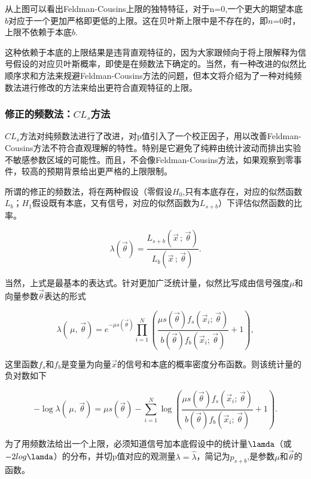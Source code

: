 从上图可以看出Feldman-Cousins上限的独特特征，对于n=0,一个更大的期望本底$b$对应于一个更加严格即更低的上限。这在贝叶斯上限中是不存在的，即$n$=0时，上限不依赖于本底$b$.

这种依赖于本底的上限结果是违背直观特征的，因为大家跟倾向于将上限解释为信号假设的对应贝叶斯概率，即使是在频数法下确定的。当然，有一种改进的似然比顺序求和方法来规避Feldman-Cousins方法的问题，但本文将介绍为了一种对纯频数法进行修改的方法来给出更符合直观特征的上限。

\subsubsection{修正的频数法：$CL_{s}$方法}

$CL_{s}$方法对纯频数法进行了改进，对p值引入了一个校正因子，用以改善Feldman-Cousins方法不符合直观理解的特性。特别是它避免了纯粹由统计波动而排出实验不敏感参数区域的可能性。而且，不会像Feldman-Cousins方法，如果观察到零事件，较高的预期背景给出更严格的上限限制。

所谓的修正的频数法，将在两种假设（零假设$H_{0}$,只有本底存在，对应的似然函数$L_{b}$；$H_{1}$假设既有本底，又有信号，对应的似然函数为$L_{s+b}$）下评估似然函数的比率。

\begin{equation}\label{key}
\lambda (\vec{\theta }) = \frac{L_{s+b}(\vec{x}\,;\,\vec{\theta })} {L_{b}(\vec{x}\,;\,\vec{\theta })}.
\end{equation}

当然，上式是最基本的表达式。针对更加广泛统计量，似然比写成由信号强度$\mu$和向量参数$\vec{\theta}$表达的形式

\begin{equation}\label{key}
\lambda (\,\mu,\,\vec{\theta }) = e^{-\mu s(\vec{\theta })}\prod _{ i=1}^{N}\left (\frac{\mu s(\vec{\theta })f_{s}(\vec{x}_{i};\,\vec{\theta })} {b(\vec{\theta })f_{b}(\vec{x}_{i};\,\vec{\theta })} + 1\right ),
\end{equation}

这里函数$f_{s}$和$f_{b}$是变量为向量$\vec{x}$的信号和本底的概率密度分布函数。则该统计量的负对数如下

\begin{equation}\label{key}
-\log \lambda (\,\mu,\,\vec{\theta }) =\mu s(\vec{\theta }) -\sum _{i=1}^{N}\log \left (\frac{\mu s(\vec{\theta })f_{s}(\vec{x}_{i};\,\vec{\theta })} {b(\vec{\theta })f_{b}(\vec{x}_{i};\,\vec{\theta })} + 1\right ).
\end{equation}

为了用频数法给出一个上限，必须知道信号加本底假设中的统计量$\lamda$（或$-2log\lamda$）的分布，并切p值对应的观测量$\lambda =\hat{\lambda }$，简记为$p_{s+b}$,是参数$\mu$和$\vec{\theta}$的函数。

